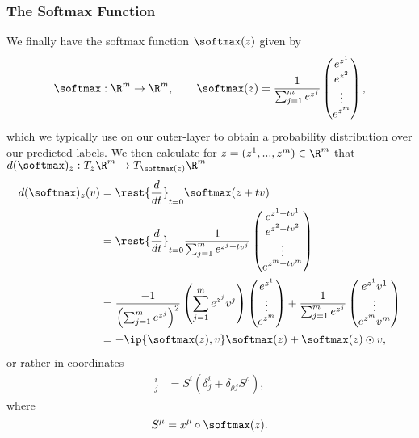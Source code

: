 \subsubsection{The Softmax Function}
We finally have the softmax function $\softmax(z)$ given by
$$\softmax:\R^m\to\R^m,\qquad \softmax(z)=\frac{1}{\sum_{j=1}^me^{z^j}}\begin{pmatrix}
	e^{z^1}\\
	e^{z^2}\\
	\vdots\\
	e^{z^m}
\end{pmatrix},$$
which we typically use on our outer-layer to obtain a probability distribution over our predicted labels.  We then calculate for $z=(z^1,...,z^m)\in\R^m$ that $d(\softmax)_z:T_z\R^m\to T_{\softmax(z)}\R^m$
\begin{align*}
	d(\softmax)_z(v)&=\rest{\frac{d}{dt}}_{t=0}\softmax(z+tv)\\
	&=\rest{\frac{d}{dt}}_{t=0}\frac{1}{\sum_{j=1}^me^{z^j+tv^j}}\begin{pmatrix}
		e^{z^1+tv^1}\\
		e^{z^2+tv^2}\\
		\vdots\\
		e^{z^m+tv^m}
	\end{pmatrix}\\
	&=\frac{-1}{\left(\sum_{j=1}^me^{z^j}\right)^2}\left(\sum_{j=1}^me^{z^j}v^j\right)\begin{pmatrix}
		e^{z^1}\\
		\vdots\\
		e^{z^m}
	\end{pmatrix}+\frac{1}{\sum_{j=1}^me^{z^j}}\begin{pmatrix}
		e^{z^1}v^1\\
		\vdots\\
		e^{z^m}v^m
	\end{pmatrix}\\
	&=-\ip{\softmax(z),v}\softmax(z)+\softmax(z)\odot v,
\end{align*}
or rather in coordinates
\begin{align*}
	[d(\softmax)_z]^i_j&=S^i(\delta^i_j+\delta_{\rho j}S^\rho),
\end{align*}
where
$$S^\mu=x^\mu\circ\softmax(z).$$





